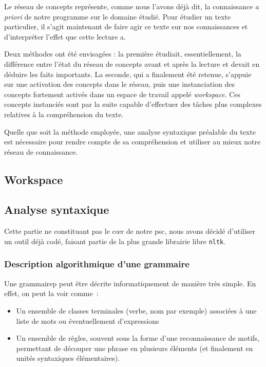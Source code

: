 \documentclass[a4paper,12pt]{article}
\newcommand{\pyt}[1]{\texttt{#1}}
\begin{document}
Le réseau de concepts représente, comme nous l'avons déjà dit, la connaissance \textit{a priori} de notre programme sur le domaine étudié. Pour étudier un texte particulier, il s'agit maintenant de faire agir ce texte sur nos connaissances et d'interpréter l'effet que cette lecture a.

Deux méthodes ont été envisagées : la première étudiait, essentiellement, la différence entre l'état du réseau de concepts avant et après la lecture et devait en déduire les faits importants. La seconde, qui a finalement été retenue, s'appuie sur une activation des concepts dans le réseau, puis une instanciation des concepts fortement activés dans un espace de travail appelé \textit{workspace}. Ces concepts instanciés sont par la suite capable d'effectuer des tâches plus complexes relatives à la compréhension du texte.

Quelle que soit la méthode employée, une analyse syntaxique préalable du texte est nécessaire pour rendre compte de sa compréhension et utiliser au mieux notre réseau de connaissance.

\subsection{Workspace}



\subsection{Analyse syntaxique}

Cette partie ne constituant pas le c\oe{}r de notre psc, nous avons décidé d'utiliser un outil déjà codé, faisant partie de la plus grande librairie libre \pyt{nltk}.

\subsubsection{Description algorithmique d'une grammaire}
Une grammairep peut être décrite informatiquement de manière très simple. En effet, on peut la voir comme~:
\begin{itemize}
	\item Un ensemble de classes terminales (verbe, nom par exemple) associées à une liste de mots ou éventuellement d'expressions
	\item Un ensemble de règles, souvent sous la forme d'une reconnaissance de motifs, permettant de découper une phrase en plusieurs éléments (et finalement en unités syntaxiques élémentaires).
\end{itemize}
\end{document}
